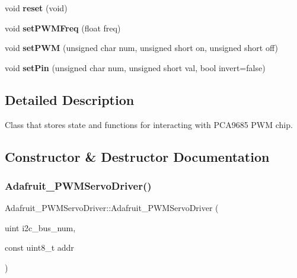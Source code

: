 \begin{DoxyCompactItemize}
void {\bfseries reset} (void)
\item 
\mbox{\label{classAdafruit__PWMServoDriver_a0ef6f1e3c81aebbd1d1da1bb12f3ed5c}} 
void {\bfseries set\+P\+W\+M\+Freq} (float freq)
\item 
\mbox{\label{classAdafruit__PWMServoDriver_a8d110f943e906fd20eec6c8e6a1fad77}} 
void {\bfseries set\+P\+WM} (unsigned char num, unsigned short on, unsigned short off)
\item 
\mbox{\label{classAdafruit__PWMServoDriver_a7ed256f8594418bd5bf26658b81f7b6e}} 
void {\bfseries set\+Pin} (unsigned char num, unsigned short val, bool invert=false)
\end{DoxyCompactItemize}


\subsection{Detailed Description}
Class that stores state and functions for interacting with P\+C\+A9685 P\+WM chip. 

\subsection{Constructor \& Destructor Documentation}
\mbox{\label{classAdafruit__PWMServoDriver_abbbbdc51fe0ffb92f7c4d1b2ab1ec6b6}} 
\subsubsection{\texorpdfstring{Adafruit\+\_\+\+P\+W\+M\+Servo\+Driver()}{Adafruit\_PWMServoDriver()}}
{\footnotesize\ttfamily Adafruit\+\_\+\+P\+W\+M\+Servo\+Driver\+::\+Adafruit\+\_\+\+P\+W\+M\+Servo\+Driver (\begin{DoxyParamCaption}\item[{uint}]{i2c\+\_\+bus\+\_\+num,  }\item[{const uint8\+\_\+t}]{addr }\end{DoxyParamCaption})}



